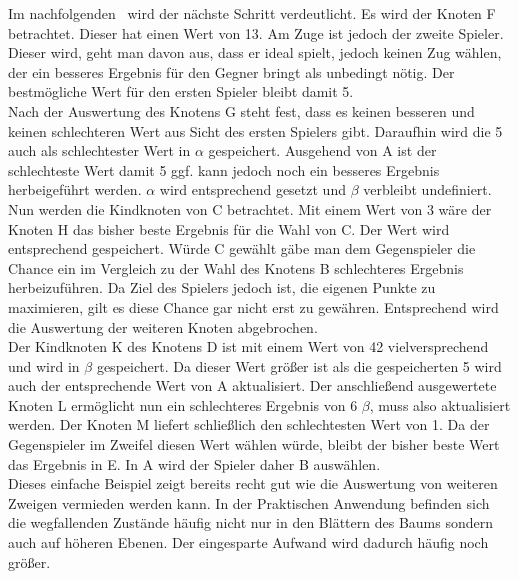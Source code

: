 Im nachfolgenden \gtree\ wird der nächste Schritt verdeutlicht. Es wird der Knoten F betrachtet. Dieser hat einen Wert von 13. Am Zuge ist jedoch der zweite Spieler. Dieser wird, geht man davon aus, dass er ideal spielt, jedoch keinen Zug wählen, der ein besseres Ergebnis für den Gegner bringt als unbedingt nötig. Der bestmögliche Wert für den ersten Spieler bleibt damit 5.
\\Nach der Auswertung des Knotens G steht fest, dass es keinen besseren und keinen schlechteren Wert aus Sicht des ersten Spielers gibt. Daraufhin wird die 5 auch als schlechtester Wert in $\alpha$ gespeichert. Ausgehend von A  ist der schlechteste Wert damit 5 ggf. kann jedoch noch ein besseres Ergebnis herbeigeführt werden. $\alpha$ wird entsprechend gesetzt und $\beta$ verbleibt undefiniert.\\
Nun werden die Kindknoten von C betrachtet. Mit einem Wert von 3 wäre der Knoten H das bisher beste Ergebnis für die Wahl von C. Der Wert wird entsprechend gespeichert. Würde C gewählt gäbe man dem Gegenspieler die Chance ein im Vergleich zu der Wahl des Knotens B schlechteres Ergebnis herbeizuführen. Da Ziel des Spielers jedoch ist, die eigenen Punkte zu maximieren, gilt es diese Chance gar nicht erst zu gewähren. Entsprechend wird die Auswertung der weiteren Knoten abgebrochen.\\
Der Kindknoten K des Knotens D ist mit einem Wert von 42 vielversprechend und wird in $\beta$ gespeichert. Da dieser Wert größer ist als die gespeicherten 5 wird auch der entsprechende Wert von A aktualisiert. Der anschließend ausgewertete Knoten L ermöglicht nun ein schlechteres Ergebnis von 6 $\beta$, muss also aktualisiert werden. Der Knoten M liefert schließlich den schlechtesten Wert von 1. Da der Gegenspieler im Zweifel diesen Wert wählen würde, bleibt der bisher beste Wert das Ergebnis in E. In A wird der Spieler daher B auswählen.
\vspace{0.5cm}\\ 
Dieses einfache Beispiel zeigt bereits recht gut wie die Auswertung von weiteren Zweigen vermieden werden kann. In der Praktischen Anwendung befinden sich die wegfallenden Zustände häufig nicht nur in den Blättern des Baums sondern auch auf höheren Ebenen. Der eingesparte Aufwand wird dadurch häufig noch größer.  

